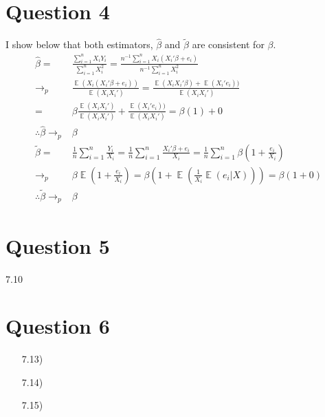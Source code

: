 \documentclass{article}
\renewcommand{\tilde}[1]{\widetilde{#1}}
\newcommand{\tb}{\tilde{\beta}}
\newcommand{\bhat}{\hat{\beta}}
\DeclareMathOperator{\E}{\mathbb{E}}%
\begin{document}
\section*{Question 4}
I show below that both estimators, $\bhat$ and $\tb$ are consistent for $\beta$.
\begin{align*}
			\bhat	= 	&\frac{\sum_{i=1}^nX_iY_i}{\sum_{i=1}^nX_i^2} = \frac{n^{-1}\sum_{i=1}^nX_i(X_i'\beta + e_i)}{n^{-1}\sum_{i=1}^nX_i^2}	\\
		\rightarrow_p	&\frac{\E(X_i(X_i'\beta + e_i))}{\E(X_iX_i')} = \frac{\E(X_iX_i'\beta) + \E(X_i'e_i))}{\E(X_iX_i')} \\
					= 	&\beta\frac{\E(X_iX_i')}{\E(X_iX_i')}+\frac{\E(X_i'e_i))}{\E(X_iX_i')} = \beta(1) + 0	\\
\therefore	\bhat\rightarrow_p&\beta																					\\
			\tb		=	&\frac{1}{n}\sum_{i=1}^n\frac{Y_i}{X_i} = \frac{1}{n}\sum_{i=1}^n\frac{X_i'\beta + e_i}{X_i} = \frac{1}{n}\sum_{i=1}^n\beta\left(1+\frac{e_i}{X_i}\right)	\\
		\rightarrow_p	&\beta\E\left(1+\frac{e_i}{X_i}\right) = \beta\left(1+\E\left(\frac{1}{X_i}\E(e_i|X)\right)\right) = \beta(1+0)	\\
\therefore	\tb\rightarrow_p&\beta																			
\end{align*}




\section*{Question 5}
7.10


\section*{Question 6}
\begin{itemize}
	\item[7.13)] 
	
	\item[7.14)] 
	
	\item[7.15)] 
	
\end{itemize}


\end{document}
